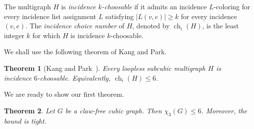 \documentclass[a4paper,11pt]{article}
\newtheorem{theorem}             {Theorem}
\theoremstyle{case}
\numberwithin{subcase}{case}
\begin{document}
The multigraph $H$ is \emph{incidence $k$-choosable} if it admits an
incidence $L$-coloring for every incidence list assignment $L$
satisfying
$
    |L(v,e)|\geq k
$
for every incidence $(v,e)$. The \emph{incidence choice number} of $H$,
denoted by $\operatorname{ch}_{i}(H)$, is the least integer $k$ for
which $H$ is incidence $k$-choosable.

We shall use the following theorem of Kang and Park.

\begin{theorem}[Kang and Park~\cite{KangPark2019}]
\label{thm:kang-park}
Every loopless subcubic multigraph $H$ is incidence
$6$-choosable. Equivalently,
$    \operatorname{ch}_{i}(H)\leq 6$.
\end{theorem}

We are ready to show our first theorem.

\begin{theorem} \label{thm:clawfreeleq6}
Let $G$ be a claw-free cubic graph. Then $\chi_3(G)\leq 6$.
Moreover, the bound is tight.
\end{theorem}
\end{document}
